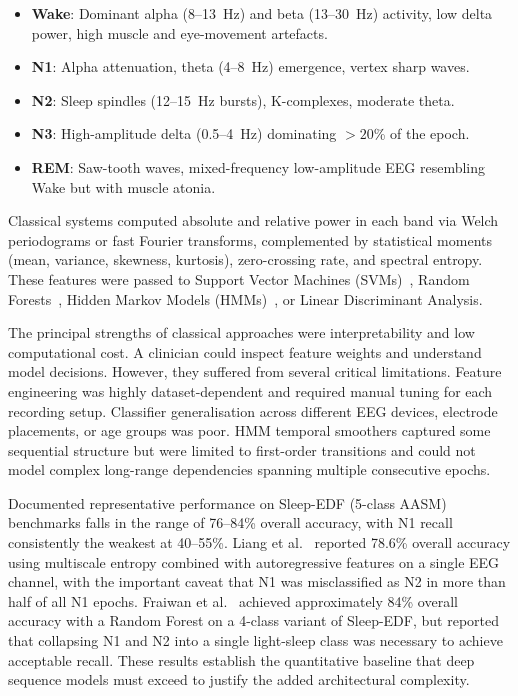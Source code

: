 \documentclass[10pt]{article}
\begin{document}
\begin{itemize}
  \item \textbf{Wake}: Dominant alpha (8--13~Hz) and beta (13--30~Hz) activity, low delta power, high muscle and eye-movement artefacts.
  \item \textbf{N1}: Alpha attenuation, theta (4--8~Hz) emergence, vertex sharp waves.
  \item \textbf{N2}: Sleep spindles (12--15~Hz bursts), K-complexes, moderate theta.
  \item \textbf{N3}: High-amplitude delta (0.5--4~Hz) dominating $>20$\% of the epoch.
  \item \textbf{REM}: Saw-tooth waves, mixed-frequency low-amplitude EEG resembling Wake but with muscle atonia.
\end{itemize}

Classical systems computed absolute and relative power in each band via Welch periodograms or fast Fourier transforms, complemented by statistical moments (mean, variance, skewness, kurtosis), zero-crossing rate, and spectral entropy. These features were passed to Support Vector Machines (SVMs)~\cite{liang2012automatic}, Random Forests~\cite{fraiwan2012automated}, Hidden Markov Models (HMMs)~\cite{doroshenkov2007classification}, or Linear Discriminant Analysis.

The principal strengths of classical approaches were interpretability and low computational cost. A clinician could inspect feature weights and understand model decisions. However, they suffered from several critical limitations. Feature engineering was highly dataset-dependent and required manual tuning for each recording setup. Classifier generalisation across different EEG devices, electrode placements, or age groups was poor. HMM temporal smoothers captured some sequential structure but were limited to first-order transitions and could not model complex long-range dependencies spanning multiple consecutive epochs.

Documented representative performance on Sleep-EDF (5-class AASM) benchmarks falls in the range of 76--84\% overall accuracy, with N1 recall consistently the weakest at 40--55\%. Liang et al.~\cite{liang2012automatic} reported 78.6\% overall accuracy using multiscale entropy combined with autoregressive features on a single EEG channel, with the important caveat that N1 was misclassified as N2 in more than half of all N1 epochs. Fraiwan et al.~\cite{fraiwan2012automated} achieved approximately 84\% overall accuracy with a Random Forest on a 4-class variant of Sleep-EDF, but reported that collapsing N1 and N2 into a single light-sleep class was necessary to achieve acceptable recall. These results establish the quantitative baseline that deep sequence models must exceed to justify the added architectural complexity.
\end{document}
